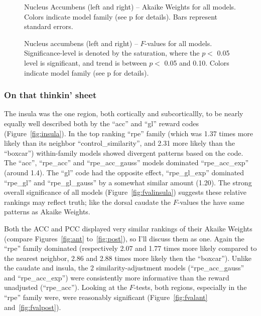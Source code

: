 \documentclass[doc,12pt]{apa}        %
\begin{document}
\begin{figure}[tp]
    \centering
    \caption{Nucleus Accumbens (left and right) -- Akaike Weights for all models.  Colors indicate model family (see p\pageref{sub:cmb} for details). Bars represent standard errors.}
	\label{fig:accumbens}
\end{figure}
\begin{figure}[tp]
    \centering
    \caption{Nucleus accumbens (left and right) -- $F$-values for all models.
    Significance-level is denoted by the saturation, where the $p <$ 0.05 level is
    significant, and trend is between $p <$ 0.05 and 0.10.  Colors indicate model family (see p\pageref{sub:cmb} for details).}
	\label{fig:fvalaccumbens}
\end{figure}

\subsubsection{On that thinkin' sheet}
\label{subsub:onsheet}
The insula was the one region, both cortically and subcorticallly, to be nearly equally well described both by the ``acc'' and ``gl'' reward codes (Figure~\ref{fig:insula}).  In the top ranking ``rpe'' family (which was 1.37 times more likely than its neighbor ``control\_similarity'', and 2.31 more likely than the ``boxcar'') within-family models showed divergent patterns based on the code.  The ``acc'', ``rpe\_acc'' and ``rpe\_acc\_gauss'' models dominated ``rpe\_acc\_exp'' (around 1.4).  The ``gl'' code had the opposite effect, ``rpe\_gl\_exp'' dominated ``rpe\_gl'' and ``rpe\_gl\_gauss'' by a somewhat similar amount (1.20).  The strong overall significance of all models (Figure~\ref{fig:fvalinsula}) suggests these relative rankings may reflect truth; like the dorsal caudate the $F$-values the have same patterns as Akaike Weights.

Both the ACC and PCC displayed very similar rankings of their Akaike Weights (compare Figures~\ref{fig:ant} to~\ref{fig:post}), so I'll discuss them as one.  Again the ``rpe'' family dominated (respectively 2.07 and 1.77 times more likely compared to the nearest neighbor, 2.86 and 2.88 times more likely then the ``boxcar'').  Unlike the caudate and insula, the 2 similarity-adjustment models (``rpe\_acc\_gauss'' and ``rpe\_acc\_exp'') were consistently more informative than the reward unadjusted (``rpe\_acc'').  Looking at the $F$-tests, both regions, especially in the ``rpe'' family were, were reasonably significant (Figure~\ref{fig:fvalant} and~\ref{fig:fvalpost}).
\end{document}
